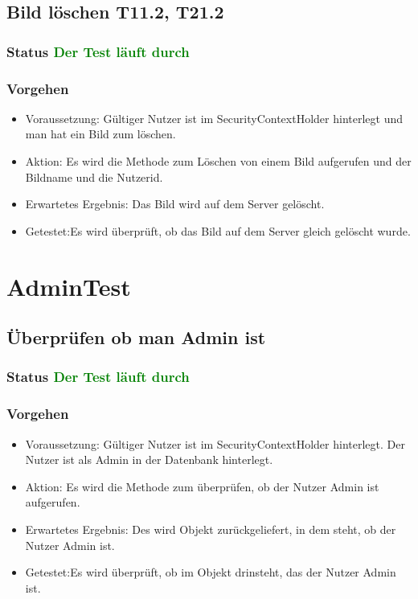 \subsection{Bild löschen T11.2, T21.2}
\subsubsection{Status \textcolor{green}{ Der Test läuft durch} }
\subsubsection{Vorgehen}
\begin{itemize}
	\item Voraussetzung: Gültiger Nutzer ist im SecurityContextHolder hinterlegt und man hat ein Bild zum löschen.
	\item Aktion: Es wird die Methode zum Löschen von einem Bild aufgerufen und der Bildname und die Nutzerid. 
	\item Erwartetes Ergebnis: Das Bild wird auf dem Server gelöscht.
	\item Getestet:Es wird überprüft, ob das Bild auf dem Server gleich gelöscht wurde.
\end{itemize}


\section{AdminTest}
\subsection{Überprüfen ob man Admin ist}
\subsubsection{Status \textcolor{green}{ Der Test läuft durch} }
\subsubsection{Vorgehen}
\begin{itemize}
	\item Voraussetzung: Gültiger Nutzer ist im SecurityContextHolder hinterlegt. Der Nutzer ist als Admin in der Datenbank hinterlegt.
	\item Aktion: Es wird die Methode zum überprüfen, ob der Nutzer Admin ist aufgerufen.
	\item Erwartetes Ergebnis: Des wird Objekt zurückgeliefert, in dem steht, ob der Nutzer Admin ist.
	\item Getestet:Es wird überprüft, ob im Objekt drinsteht, das der Nutzer Admin ist.
\end{itemize}

